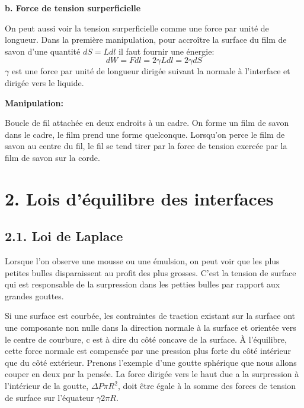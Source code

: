 \documentclass[french, a4paper, 10pt, twocolumn, landscape]{article}
\begin{document}
\textbf{b. Force de tension surperficielle}

On peut aussi voir la tension surperficielle comme une force par unit{\'e} de longueur. Dans la premi{\`e}re manipulation, pour accro{\^i}tre la surface du film de savon d'une quantit{\'e} $d S = L d l$ il faut fournir une {\'e}nergie:
\begin{equation} 
  d W = F d l = 2 \gamma L d l = 2 \gamma d S
\end{equation}
$\gamma$ est une force par unit{\'e} de longueur dirig{\'e}e suivant la
normale {\`a} l'interface et dirig{\'e}e vers le liquide.\medskip

\textbf{Manipulation:}

Boucle de fil attach{\'e}e en deux endroits {\`a} un cadre. On forme un film de savon dans le cadre, le film prend une forme quelconque. Lorsqu'on perce le film de savon au centre du fil, le fil se tend tirer par la force de tension exerc{\'e}e par la film de savon sur la corde.



\section*{2. Lois d'{\'e}quilibre des interfaces}

\subsection*{2.1. Loi de Laplace}

Lorsque l'on observe une mousse ou une {\'e}mulsion, on peut voir que les plus
petites bulles disparaissent au profit des plus grosses. C'est la tension de
surface qui est responsable de la surpression dans les petties bulles par
rapport aux grandes gouttes.\medskip


Si une surface est courb{\'e}e, les contraintes de traction existant sur la surface ont une composante non nulle dans la direction normale {\`a} la surface et orient{\'e}e vers le centre de courbure, c est {\`a} dire du c{\^o}t{\'e} concave de la surface. {\`A} l'{\'e}quilibre, cette force normale est compens{\'e}e par une pression plus forte du c{\^o}t{\'e} int{\'e}rieur
que du c{\^o}t{\'e} ext{\'e}rieur. Prenons l'exemple d'une goutte sph{\'e}rique que nous allons couper en deux par la pens{\'e}e. La force dirig{\'e}e vers le haut due a la surpression {\`a} l'int{\'e}rieur de la
goutte, $\Delta P \pi R^2$, doit {\^e}tre {\'e}gale {\`a} la somme des forces de tension de surface sur l'{\'e}quateur $\gamma 2 \pi R$.
\end{document}
